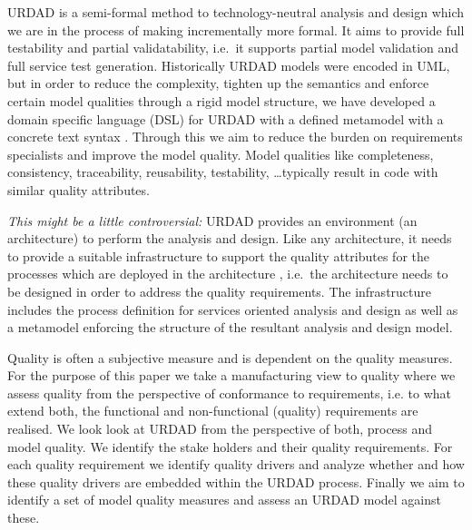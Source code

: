 URDAD is a semi-formal method to technology-neutral analysis and design \cite{solms_urdad_2010} which we are in the process of making incrementally more formal. It aims to provide full testability and partial validatability, i.e.\ it supports partial model validation and full service test generation. Historically URDAD models were encoded in UML, but in order to reduce the complexity, tighten up the semantics and enforce certain model qualities through a rigid model structure, we have developed a domain specific language (DSL) for URDAD with a defined metamodel with a concrete text syntax \cite{solmsfritz_domain-specific_????}. Through this we aim to reduce the burden on requirements specialists and improve the model quality. Model qualities like completeness, consistency, traceability, reusability, testability, \dots typically result in code with similar quality attributes\cite{findItIfYouCan}.

\emph{This might be a little controversial:} URDAD provides an environment (an architecture) to perform the analysis and design. Like any architecture, it needs to provide a suitable infrastructure to support the quality attributes for the processes which are deployed in the architecture \cite{}, i.e.\ the architecture needs to be designed in order to address the quality requirements. The infrastructure includes the process definition for services oriented analysis and design as well as a metamodel enforcing the structure of the resultant analysis and design model.

Quality is often a subjective measure and is dependent on the quality measures. For the purpose of this paper we take a manufacturing view \cite{garvin_what_1984} to quality where we assess quality from the perspective of conformance to requirements, i.e. to what extend both, the functional and non-functional (quality) requirements are realised. We look look at URDAD from the perspective of both, process and model quality. We identify the stake holders and their quality requirements. For each quality requirement we identify quality drivers and analyze whether and how these quality drivers are embedded within the URDAD process. Finally we aim to identify a set of model quality measures and assess an URDAD model against these.


